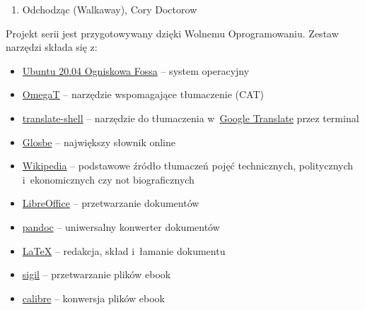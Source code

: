 \documentclass[oneside,polish,11pt,sfheadings]{mwbk}
\begin{document}
\begin{enumerate}
\item Odchodząc (Walkaway), Cory Doctorow
\end{enumerate}

\newpage

Projekt serii jest przygotowywany dzięki Wolnemu Oprogramowaniu. Zestaw narzędzi składa się z:
\begin{itemize}
\item \href{https://ubuntu.com/}{Ubuntu 20.04 Ogniskowa Fossa} -- system operacyjny
\item \href{https://omegat.org/}{OmegaT} -- narzędzie wspomagające tłumaczenie (CAT)
\item \href{https://github.com/soimort/translate-shell}{translate-shell} -- narzędzie do tłumaczenia w~\href{https://translate.google.pl}{Google Translate} przez terminal 
\item \href{https://glosbe.com/en/pl}{Glosbe} -- największy słownik online
\item \href{https://www.wikipedia.org/}{Wikipedia} -- podstawowe źródło tłumaczeń pojęć technicznych, politycznych i~ekonomicznych czy not biograficznych
\item \href{https://www.libreoffice.org/}{LibreOffice} -- przetwarzanie dokumentów 
\item \href{http://pandoc.org}{pandoc} -- uniwersalny konwerter dokumentów 
\item \href{https://www.latex-project.org/}{LaTeX} -- redakcja, skład i~łamanie dokumentu
\item \href{https://sigil-ebook.com/}{sigil} -- przetwarzanie plików ebook
\item \href{https://calibre-ebook.com/}{calibre} -- konwersja plików ebook
\end{itemize}



\newpage
\printendnotes

\tableofcontents{}
\end{document}

